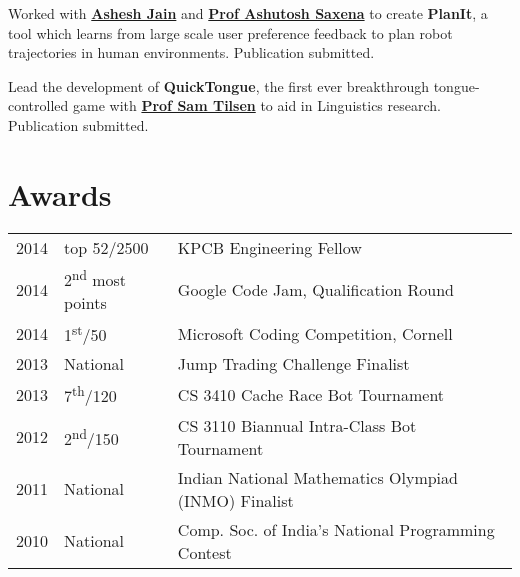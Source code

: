 \documentclass[letterpaper]{deedy-resume} %
\begin{document}
\begin{minipage}[t]{0.69\textwidth}

Worked with \textbf{\href{http://www.cs.cornell.edu/~ashesh/}{Ashesh Jain}} and \textbf{\href{http://www.cs.cornell.edu/~asaxena/}{Prof Ashutosh Saxena}} to create \textbf{PlanIt}, a tool which learns from large scale user preference feedback to plan robot trajectories in human environments. Publication submitted.

\sectionspace %



Lead the development of \textbf{QuickTongue}, the first ever breakthrough tongue-controlled game with \textbf{\href{http://conf.ling.cornell.edu/~tilsen/}{Prof Sam Tilsen}} to aid in Linguistics research. Publication submitted.

\sectionspace %


\section{Awards} 

\begin{tabular}{rll}
2014	 & top 52/2500 & KPCB Engineering Fellow\\
2014	 & 2\textsuperscript{nd} most points & Google Code Jam, Qualification Round\\
2014	 & 1\textsuperscript{st}/50 & Microsoft Coding Competition, Cornell\\
2013	 & National & Jump Trading Challenge Finalist\\
2013 & 7\textsuperscript{th}/120 & CS 3410 Cache Race Bot Tournament \\
2012 & 2\textsuperscript{nd}/150 & CS 3110 Biannual Intra-Class Bot Tournament \\
2011 & National & Indian National Mathematics Olympiad (INMO) Finalist \\
2010 & National & Comp. Soc. of India's National Programming Contest\\
\end{tabular}


\end{minipage}
\end{document}
